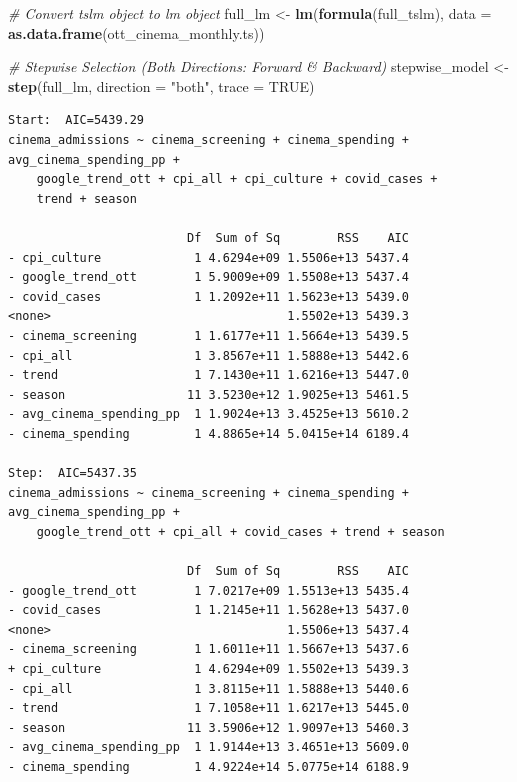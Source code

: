 \documentclass[
]{article}
\newenvironment{Shaded}{\begin{snugshade}}{\end{snugshade}}
\newcommand{\AttributeTok}[1]{\textcolor[rgb]{0.13,0.29,0.53}{#1}}
\newcommand{\CommentTok}[1]{\textcolor[rgb]{0.56,0.35,0.01}{\textit{#1}}}
\newcommand{\ConstantTok}[1]{\textcolor[rgb]{0.56,0.35,0.01}{#1}}
\newcommand{\FunctionTok}[1]{\textcolor[rgb]{0.13,0.29,0.53}{\textbf{#1}}}
\newcommand{\NormalTok}[1]{#1}
\newcommand{\OtherTok}[1]{\textcolor[rgb]{0.56,0.35,0.01}{#1}}
\newcommand{\StringTok}[1]{\textcolor[rgb]{0.31,0.60,0.02}{#1}}
\begin{document}
\begin{Shaded}
\begin{Highlighting}[]
\CommentTok{\# Convert tslm object to lm object}
\NormalTok{full\_lm }\OtherTok{\textless{}{-}} \FunctionTok{lm}\NormalTok{(}\FunctionTok{formula}\NormalTok{(full\_tslm), }\AttributeTok{data =} \FunctionTok{as.data.frame}\NormalTok{(ott\_cinema\_monthly.ts))}

\CommentTok{\# Stepwise Selection (Both Directions: Forward \& Backward)}
\NormalTok{stepwise\_model }\OtherTok{\textless{}{-}} \FunctionTok{step}\NormalTok{(full\_lm, }\AttributeTok{direction =} \StringTok{"both"}\NormalTok{, }\AttributeTok{trace =} \ConstantTok{TRUE}\NormalTok{)}
\end{Highlighting}
\end{Shaded}

\begin{verbatim}
Start:  AIC=5439.29
cinema_admissions ~ cinema_screening + cinema_spending + avg_cinema_spending_pp + 
    google_trend_ott + cpi_all + cpi_culture + covid_cases + 
    trend + season

                         Df  Sum of Sq        RSS    AIC
- cpi_culture             1 4.6294e+09 1.5506e+13 5437.4
- google_trend_ott        1 5.9009e+09 1.5508e+13 5437.4
- covid_cases             1 1.2092e+11 1.5623e+13 5439.0
<none>                                 1.5502e+13 5439.3
- cinema_screening        1 1.6177e+11 1.5664e+13 5439.5
- cpi_all                 1 3.8567e+11 1.5888e+13 5442.6
- trend                   1 7.1430e+11 1.6216e+13 5447.0
- season                 11 3.5230e+12 1.9025e+13 5461.5
- avg_cinema_spending_pp  1 1.9024e+13 3.4525e+13 5610.2
- cinema_spending         1 4.8865e+14 5.0415e+14 6189.4

Step:  AIC=5437.35
cinema_admissions ~ cinema_screening + cinema_spending + avg_cinema_spending_pp + 
    google_trend_ott + cpi_all + covid_cases + trend + season

                         Df  Sum of Sq        RSS    AIC
- google_trend_ott        1 7.0217e+09 1.5513e+13 5435.4
- covid_cases             1 1.2145e+11 1.5628e+13 5437.0
<none>                                 1.5506e+13 5437.4
- cinema_screening        1 1.6011e+11 1.5667e+13 5437.6
+ cpi_culture             1 4.6294e+09 1.5502e+13 5439.3
- cpi_all                 1 3.8115e+11 1.5888e+13 5440.6
- trend                   1 7.1058e+11 1.6217e+13 5445.0
- season                 11 3.5906e+12 1.9097e+13 5460.3
- avg_cinema_spending_pp  1 1.9144e+13 3.4651e+13 5609.0
- cinema_spending         1 4.9224e+14 5.0775e+14 6188.9


\end{verbatim}
\end{document}
